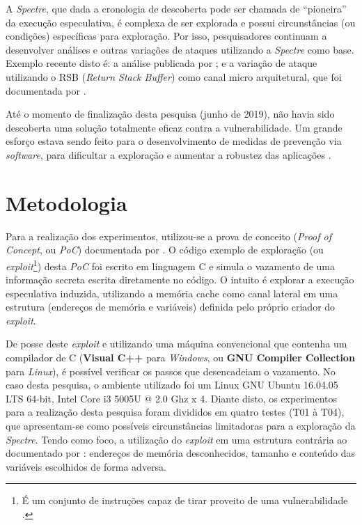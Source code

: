 \documentclass[conference]{IEEEtran}
\begin{document}
A \emph{Spectre}, que dada a cronologia de descoberta pode ser chamada de ``pioneira'' da execução especulativa, é complexa de ser explorada e possui circunstâncias (ou condições) específicas para exploração. Por isso, pesquisadores continuam a desenvolver análises e outras variações de ataques utilizando a \emph{Spectre} como base. Exemplo recente disto é: a análise publicada por ; e a variação de ataque utilizando o RSB (\emph{Return Stack Buffer}) como canal micro arquitetural, que foi documentada por .

Até o momento de finalização desta pesquisa (junho de 2019), não havia sido descoberta uma solução totalmente eficaz contra a vulnerabilidade. Um grande esforço estava sendo feito para o desenvolvimento de medidas de prevenção via \emph{software}, para dificultar a exploração e aumentar a robustez das aplicações \cite{Graz2018Meltdown}.

\section{Metodologia}
Para a realização dos experimentos, utilizou-se a prova de conceito (\emph{Proof of Concept}, ou \emph{PoC}) documentada por . O código exemplo de exploração (ou \emph{exploit}\footnote{É um conjunto de instruções \cite{Cruz2016Estudo} capaz de tirar proveito de uma vulnerabilidade \cite{Cambridge2019Exploit}.}) desta \emph{PoC} foi escrito em linguagem C e simula o vazamento de uma informação secreta escrita diretamente no código. O intuito é explorar a execução especulativa induzida, utilizando a memória cache como canal lateral em uma estrutura (endereços de memória e variáveis) definida pelo próprio criador do \emph{exploit}. 

De posse deste \emph{exploit} e utilizando uma máquina convencional que contenha um compilador de C (\textbf{Visual C++} para \emph{Windows}, ou \textbf{GNU Compiler Collection} para \emph{Linux}), é possível verificar os passos que desencadeiam o vazamento. No caso desta pesquisa, o ambiente utilizado foi um Linux GNU Ubuntu 16.04.05 LTS 64-bit, Intel\textsuperscript{\tiny\textregistered} Core\textsuperscript{\tiny\texttrademark} i3 5005U @ 2.0 Ghz x 4. Diante disto, os experimentos para a realização desta pesquisa foram divididos em quatro testes (T01 à T04), que apresentam-se como possíveis circunstâncias limitadoras para a exploração da \emph{Spectre}. Tendo como foco, a utilização do \emph{exploit} em uma estrutura contrária ao documentado por : endereços de memória desconhecidos, tamanho e conteúdo das variáveis escolhidos de forma adversa.
\end{document}
